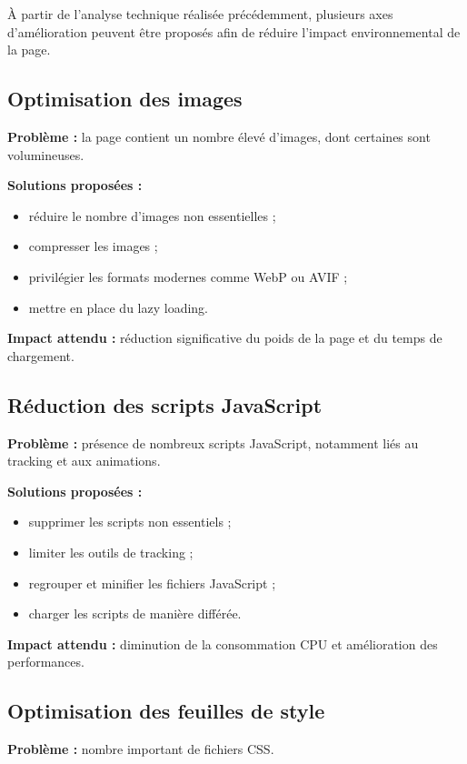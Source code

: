 \documentclass[11pt,a4paper]{article}
\begin{document}
À partir de l'analyse technique réalisée précédemment, plusieurs axes d'amélioration peuvent être proposés afin de réduire l'impact environnemental de la page.

\subsection{Optimisation des images}

\textbf{Problème :} la page contient un nombre élevé d'images, dont certaines sont volumineuses.

\textbf{Solutions proposées :}
\begin{itemize}
\item réduire le nombre d'images non essentielles ;
\item compresser les images ;
\item privilégier les formats modernes comme WebP ou AVIF ;
\item mettre en place du lazy loading.
\end{itemize}

\textbf{Impact attendu :} réduction significative du poids de la page et du temps de chargement.

\subsection{Réduction des scripts JavaScript}

\textbf{Problème :} présence de nombreux scripts JavaScript, notamment liés au tracking et aux animations.

\textbf{Solutions proposées :}
\begin{itemize}
\item supprimer les scripts non essentiels ;
\item limiter les outils de tracking ;
\item regrouper et minifier les fichiers JavaScript ;
\item charger les scripts de manière différée.
\end{itemize}

\textbf{Impact attendu :} diminution de la consommation CPU et amélioration des performances.

\subsection{Optimisation des feuilles de style}

\textbf{Problème :} nombre important de fichiers CSS.
\end{document}
